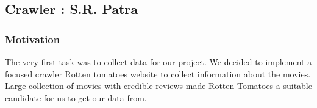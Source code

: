 \subsection{Crawler : S.R. Patra}
\subsubsection{Motivation}
The very first task was to collect data for our project. We decided to implement a focused crawler Rotten tomatoes website to collect information about the movies. Large collection of movies with credible reviews made Rotten Tomatoes a suitable candidate for us to get our data from. 